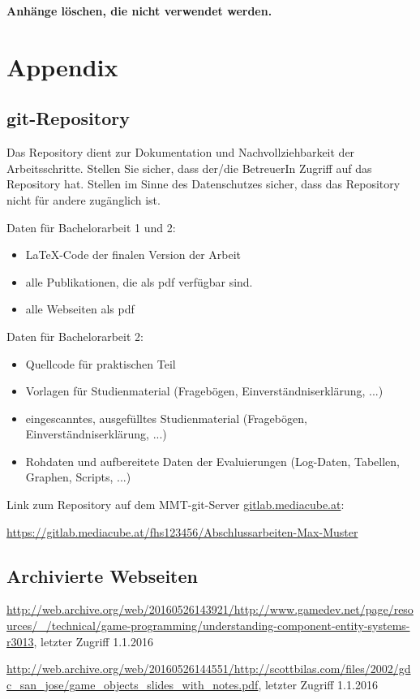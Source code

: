 \appendix

\textbf{\color{red} Anhänge löschen, die nicht verwendet werden.}

\section*{Appendix}
\renewcommand{\thesubsection}{\Alph{subsection}}

\subsection{git-Repository}

Das Repository dient zur Dokumentation und Nachvollziehbarkeit der Arbeitsschritte. Stellen Sie sicher, dass der/die BetreuerIn Zugriff auf das Repository hat. Stellen im Sinne des Datenschutzes sicher, dass das Repository nicht für andere zugänglich ist.

Daten für Bachelorarbeit 1 und 2:

\begin{itemize}
	\item LaTeX-Code der finalen Version der Arbeit
	\item alle Publikationen, die als pdf verfügbar sind.
	\item alle Webseiten als pdf
\end{itemize}

Daten für Bachelorarbeit 2:
\begin{itemize}
	\item Quellcode für praktischen Teil
	\item Vorlagen für Studienmaterial (Fragebögen, Einverständniserklärung, ...)	
	\item eingescanntes, ausgefülltes Studienmaterial (Fragebögen, Einverständniserklärung, ...)
	\item Rohdaten und aufbereitete Daten der Evaluierungen (Log-Daten, Tabellen, Graphen, Scripts, ...)	
\end{itemize}

Link zum Repository auf dem MMT-git-Server {\url{gitlab.mediacube.at}}:

{\color{red}\url{https://gitlab.mediacube.at/fhs123456/Abschlussarbeiten-Max-Muster}}

\subsection{Archivierte Webseiten}

\url{http://web.archive.org/web/20160526143921/http://www.gamedev.net/page/resources/_/technical/game-programming/understanding-component-entity-systems-r3013}, letzter Zugriff 1.1.2016

\url{http://web.archive.org/web/20160526144551/http://scottbilas.com/files/2002/gdc_san_jose/game_objects_slides_with_notes.pdf}, letzter Zugriff 1.1.2016


